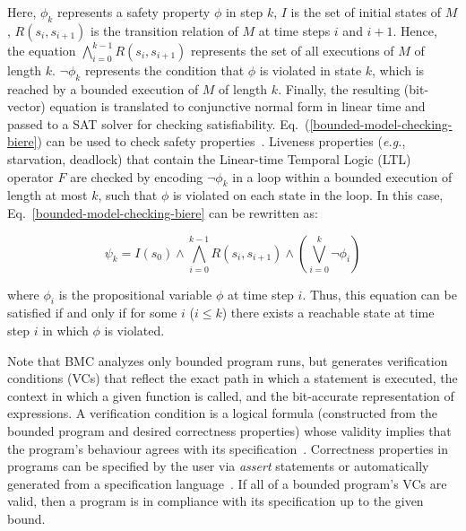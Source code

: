 \documentclass[format=acmsmall, review=false, screen=true]{acmart}
\begin{document}
\noindent Here, $\phi_{k}$ represents a safety property $\phi$ in step $k$, $I$ is the set of initial states of $M$, $R\left(s_{i},s_{i+1}\right)$ is the transition relation of $M$ at time steps $i$ and $i+1$. Hence, the equation $\bigwedge^{k-1}_{i=0} R\left(s_{i},s_{i+1}\right)$ represents the set of all executions of $M$ of length $k$. $\neg \phi_{k}$ represents the condition that $\phi$ is violated in state $k$, which is reached by a bounded execution of $M$ of length $k$. Finally, the resulting (bit-vector) equation is translated to conjunctive normal form in linear time and passed to a SAT solver for checking satisfiability. Eq.~(\ref{bounded-model-checking-biere}) can be used to check safety properties~\cite{PrasadBG05}. Liveness properties ({\it e.g.}, starvation, deadlock) that contain the Linear-time Temporal Logic (LTL) operator $F$ are checked by encoding $\neg \phi_{k}$ in a loop within a bounded execution of length at most $k$, such that $\phi$ is violated on each state in the loop. In this case, Eq.~\ref{bounded-model-checking-biere} can be rewritten as:

%
\begin{equation}
\psi_{k} = I\left(s_{0}\right) \wedge \bigwedge^{k-1}_{i=0} R\left(s_{i},s_{i+1}\right) \wedge \left(\bigvee^{k}_{i=0} \neg \phi_{i}\right)
\end{equation}

\noindent where $\phi_{i}$ is the propositional variable $\phi$ at time step $i$. Thus, this equation can be satisfied if and only if for some $i$ ($i \leq k$) there exists a reachable state at time step $i$ in which $\phi$ is violated. 

Note that BMC analyzes only bounded program runs, but generates verification conditions (VCs) that reflect the exact path in which a statement is executed, the context in which a given function is called, and the bit-accurate representation of expressions. A verification condition is a logical formula (constructed from the bounded program and desired correctness properties) whose validity implies that the program's behaviour agrees with its specification~\cite{Bradley07}. Correctness properties in programs can be specified by the user via \textit{assert} statements or automatically generated from a specification language~\cite{Thomas01}. If all of a bounded program's VCs are valid, then a program is in compliance with its specification up to the given bound.
\end{document}
